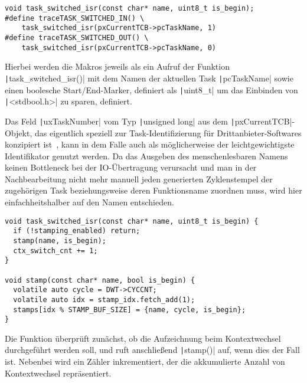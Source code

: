 \begin{code}
\begin{verbatim}
void task_switched_isr(const char* name, uint8_t is_begin);
#define traceTASK_SWITCHED_IN() \
    task_switched_isr(pxCurrentTCB->pcTaskName, 1)
#define traceTASK_SWITCHED_OUT() \
    task_switched_isr(pxCurrentTCB->pcTaskName, 0)
\end{verbatim}
\end{code}

Hierbei werden die Makros jeweils als ein Aufruf der Funktion
\texttt|task_switched_isr()| mit dem Namen der aktuellen Task
\texttt|pcTaskName| sowie einen boolesche Start/End-Marker, definiert
als \texttt|uint8_t| um das Einbinden von \texttt|<stdbool.h>|
zu sparen, definiert.

Das Feld \texttt|uxTaskNumber| vom Typ \texttt|unsigned long|
aus dem \texttt|pxCurrentTCB|-Objekt, das eigentlich speziell zur
Task-Identifizierung für Drittanbieter-Softwares konzipiert
ist~\cite{freertos_task_c_410}, kann in dem Falle auch als möglicherweise der
leichtgewichtigste Identifikator genutzt werden. Da das Ausgeben des
menschenlesbaren Namens keinen Bottleneck bei der IO-Übertragung verursacht und
man in der Nachbearbeitung nicht mehr manuell jeden generierten Zyklenstempel
der zugehörigen Task beziehungsweise deren Funktionsname zuordnen muss, wird
hier einfachheitshalber auf den Namen entschieden.

\begin{code}
\begin{verbatim}
void task_switched_isr(const char* name, uint8_t is_begin) {
  if (!stamping_enabled) return;
  stamp(name, is_begin);
  ctx_switch_cnt += 1;
}

void stamp(const char* name, bool is_begin) {
  volatile auto cycle = DWT->CYCCNT;
  volatile auto idx = stamp_idx.fetch_add(1);
  stamps[idx % STAMP_BUF_SIZE] = {name, cycle, is_begin};
}
\end{verbatim}
\end{code}

Die Funktion überprüft zunächst, ob die Aufzeichnung beim Kontextwechsel
durchgeführt werden soll, und ruft anschließend \texttt|stamp()| auf,
wenn dies der Fall ist. Nebenbei wird ein Zähler inkrementiert, der die
akkumulierte Anzahl von Kontextwechsel repräsentiert.

